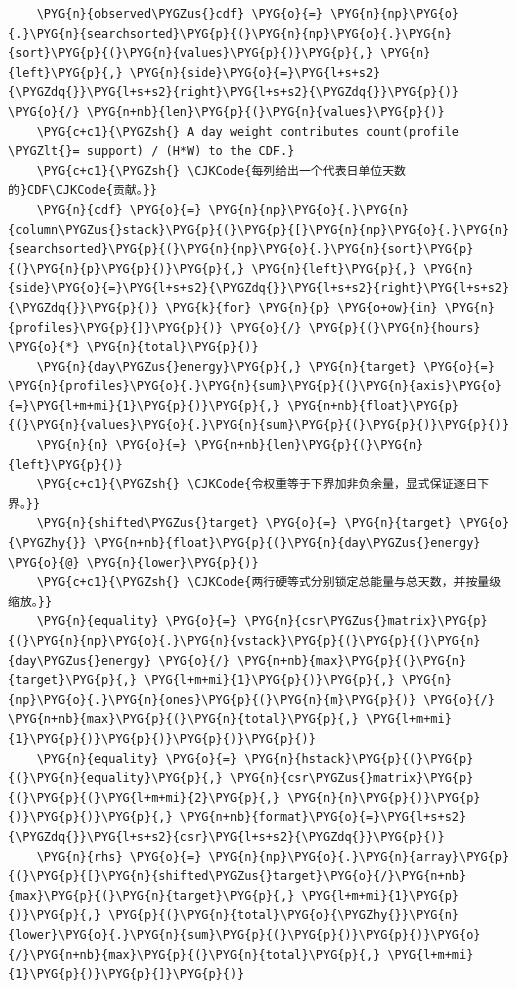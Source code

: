 \begin{Verbatim}
    \PYG{n}{observed\PYGZus{}cdf} \PYG{o}{=} \PYG{n}{np}\PYG{o}{.}\PYG{n}{searchsorted}\PYG{p}{(}\PYG{n}{np}\PYG{o}{.}\PYG{n}{sort}\PYG{p}{(}\PYG{n}{values}\PYG{p}{)}\PYG{p}{,} \PYG{n}{left}\PYG{p}{,} \PYG{n}{side}\PYG{o}{=}\PYG{l+s+s2}{\PYGZdq{}}\PYG{l+s+s2}{right}\PYG{l+s+s2}{\PYGZdq{}}\PYG{p}{)} \PYG{o}{/} \PYG{n+nb}{len}\PYG{p}{(}\PYG{n}{values}\PYG{p}{)}
    \PYG{c+c1}{\PYGZsh{} A day weight contributes count(profile \PYGZlt{}= support) / (H*W) to the CDF.}
    \PYG{c+c1}{\PYGZsh{} \CJKCode{每列给出一个代表日单位天数的}CDF\CJKCode{贡献。}}
    \PYG{n}{cdf} \PYG{o}{=} \PYG{n}{np}\PYG{o}{.}\PYG{n}{column\PYGZus{}stack}\PYG{p}{(}\PYG{p}{[}\PYG{n}{np}\PYG{o}{.}\PYG{n}{searchsorted}\PYG{p}{(}\PYG{n}{np}\PYG{o}{.}\PYG{n}{sort}\PYG{p}{(}\PYG{n}{p}\PYG{p}{)}\PYG{p}{,} \PYG{n}{left}\PYG{p}{,} \PYG{n}{side}\PYG{o}{=}\PYG{l+s+s2}{\PYGZdq{}}\PYG{l+s+s2}{right}\PYG{l+s+s2}{\PYGZdq{}}\PYG{p}{)} \PYG{k}{for} \PYG{n}{p} \PYG{o+ow}{in} \PYG{n}{profiles}\PYG{p}{]}\PYG{p}{)} \PYG{o}{/} \PYG{p}{(}\PYG{n}{hours} \PYG{o}{*} \PYG{n}{total}\PYG{p}{)}
    \PYG{n}{day\PYGZus{}energy}\PYG{p}{,} \PYG{n}{target} \PYG{o}{=} \PYG{n}{profiles}\PYG{o}{.}\PYG{n}{sum}\PYG{p}{(}\PYG{n}{axis}\PYG{o}{=}\PYG{l+m+mi}{1}\PYG{p}{)}\PYG{p}{,} \PYG{n+nb}{float}\PYG{p}{(}\PYG{n}{values}\PYG{o}{.}\PYG{n}{sum}\PYG{p}{(}\PYG{p}{)}\PYG{p}{)}
    \PYG{n}{n} \PYG{o}{=} \PYG{n+nb}{len}\PYG{p}{(}\PYG{n}{left}\PYG{p}{)}
    \PYG{c+c1}{\PYGZsh{} \CJKCode{令权重等于下界加非负余量，显式保证逐日下界。}}
    \PYG{n}{shifted\PYGZus{}target} \PYG{o}{=} \PYG{n}{target} \PYG{o}{\PYGZhy{}} \PYG{n+nb}{float}\PYG{p}{(}\PYG{n}{day\PYGZus{}energy} \PYG{o}{@} \PYG{n}{lower}\PYG{p}{)}
    \PYG{c+c1}{\PYGZsh{} \CJKCode{两行硬等式分别锁定总能量与总天数，并按量级缩放。}}
    \PYG{n}{equality} \PYG{o}{=} \PYG{n}{csr\PYGZus{}matrix}\PYG{p}{(}\PYG{n}{np}\PYG{o}{.}\PYG{n}{vstack}\PYG{p}{(}\PYG{p}{(}\PYG{n}{day\PYGZus{}energy} \PYG{o}{/} \PYG{n+nb}{max}\PYG{p}{(}\PYG{n}{target}\PYG{p}{,} \PYG{l+m+mi}{1}\PYG{p}{)}\PYG{p}{,} \PYG{n}{np}\PYG{o}{.}\PYG{n}{ones}\PYG{p}{(}\PYG{n}{m}\PYG{p}{)} \PYG{o}{/} \PYG{n+nb}{max}\PYG{p}{(}\PYG{n}{total}\PYG{p}{,} \PYG{l+m+mi}{1}\PYG{p}{)}\PYG{p}{)}\PYG{p}{)}\PYG{p}{)}
    \PYG{n}{equality} \PYG{o}{=} \PYG{n}{hstack}\PYG{p}{(}\PYG{p}{(}\PYG{n}{equality}\PYG{p}{,} \PYG{n}{csr\PYGZus{}matrix}\PYG{p}{(}\PYG{p}{(}\PYG{l+m+mi}{2}\PYG{p}{,} \PYG{n}{n}\PYG{p}{)}\PYG{p}{)}\PYG{p}{)}\PYG{p}{,} \PYG{n+nb}{format}\PYG{o}{=}\PYG{l+s+s2}{\PYGZdq{}}\PYG{l+s+s2}{csr}\PYG{l+s+s2}{\PYGZdq{}}\PYG{p}{)}
    \PYG{n}{rhs} \PYG{o}{=} \PYG{n}{np}\PYG{o}{.}\PYG{n}{array}\PYG{p}{(}\PYG{p}{[}\PYG{n}{shifted\PYGZus{}target}\PYG{o}{/}\PYG{n+nb}{max}\PYG{p}{(}\PYG{n}{target}\PYG{p}{,} \PYG{l+m+mi}{1}\PYG{p}{)}\PYG{p}{,} \PYG{p}{(}\PYG{n}{total}\PYG{o}{\PYGZhy{}}\PYG{n}{lower}\PYG{o}{.}\PYG{n}{sum}\PYG{p}{(}\PYG{p}{)}\PYG{p}{)}\PYG{o}{/}\PYG{n+nb}{max}\PYG{p}{(}\PYG{n}{total}\PYG{p}{,} \PYG{l+m+mi}{1}\PYG{p}{)}\PYG{p}{]}\PYG{p}{)}

\end{Verbatim}
